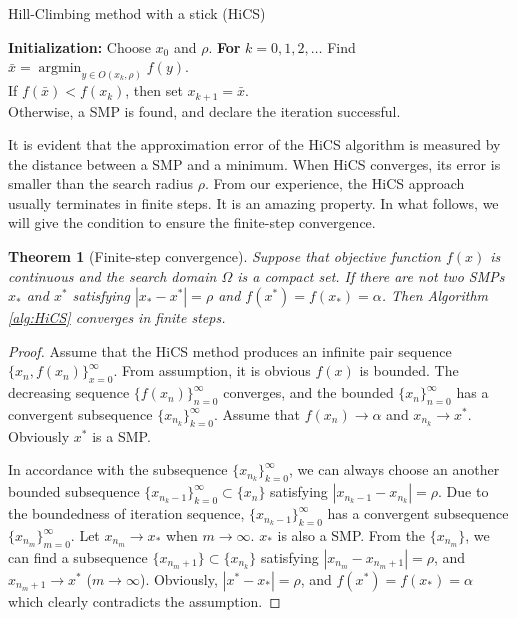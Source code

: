 \documentclass[final,1p,times]{elsarticle}
\newtheorem{theorem}{Theorem}
\DeclareMathOperator*{\argmin}{\mathrm{argmin}}
\begin{document}
\begin{algorithm}[H]
	\caption{Hill-Climbing method with a stick (HiCS)}
	\label{alg:HiCS}
\begin{algorithmic}[1]
	\STATE \textbf{Initialization:} Choose $x_0$ and $\rho$.
	\STATE \textbf{For} $k=0,1,2,\dots$
	\STATE \hspace{0.5cm} 
	Find $\bar{x}=\argmin_{y\in O(x_k,\rho)} f(y)$.
			\\
	\hspace{0.5cm} If $f(\bar x)<f(x_k)$, then set $x_{k+1}= \bar{x}$.
		  \\
		   \hspace{0.5cm} Otherwise, a SMP is found, 
		   and declare the iteration successful.
\end{algorithmic}
\end{algorithm}
It is evident that the approximation error of the HiCS algorithm
is measured by the distance between a SMP and a minimum.
When HiCS converges, its error is smaller than the search radius
$\rho$.
From our experience, the HiCS approach usually terminates in 
finite steps. It is an amazing property. In what follows, we will
give the condition to ensure the finite-step convergence.

\begin{theorem}[Finite-step convergence]
	\label{thm:fsc}
	Suppose that objective function $f(x)$ is continuous and the
	search domain $\Omega$ is a compact set.
	If there are not two SMPs $x_*$ and $x^*$ satisfying 
	$|x_*-x^*|=\rho$ and $f(x^*)=f(x_*)=\alpha$.
	Then Algorithm \ref{alg:HiCS} converges in finite steps.
\end{theorem}
\begin{proof}
	Assume that the HiCS method produces an infinite pair sequence
	$\{x_n, f(x_n)\}_{x=0}^{\infty}$. From assumption,
	it is obvious $f(x)$ is bounded. The decreasing sequence
	$\{f(x_n)\}_{n=0}^\infty$ converges, and the bounded
	$\{x_n\}_{n=0}^\infty$ has a convergent subsequence 
	$\{x_{n_k}\}_{k=0}^\infty$. Assume that $f(x_n)\rightarrow
	\alpha$ and $x_{n_k}\rightarrow x^*$. Obviously $x^*$ is a SMP.
	
	In accordance with the subsequence
	$\{x_{n_k}\}_{k=0}^\infty$, we can always choose an another
	bounded subsequence $\{x_{n_k -1}\}_{k=0}^\infty \subset
	\{x_n\}$ satisfying $|x_{n_k - 1}-x_{n_k}|=\rho$. 
	Due to the boundedness of iteration
	sequence, $\{x_{n_k-1}\}_{k=0}^\infty$ has a convergent
	subsequence $\{x_{n_{m}}\}_{m=0}^\infty$. Let $x_{n_m}
	\rightarrow x_*$ when $m\rightarrow \infty$. $x_*$ is also a SMP.
	From the $\{x_{n_m}\}$, we can find a subsequence
	$\{x_{n_{m}+1}\}\subset \{x_{n_k}\}$ satisfying
	$|x_{n_m}-x_{n_{m}+1}|=\rho$, and $x_{n_{m}+1}\rightarrow x^*$
	($m\rightarrow \infty$).
	Obviously, $|x^*-x_*|=\rho$, and $f(x^*)=f(x_*)=\alpha$ 
	which clearly contradicts the assumption.
\end{proof}
\end{document}
